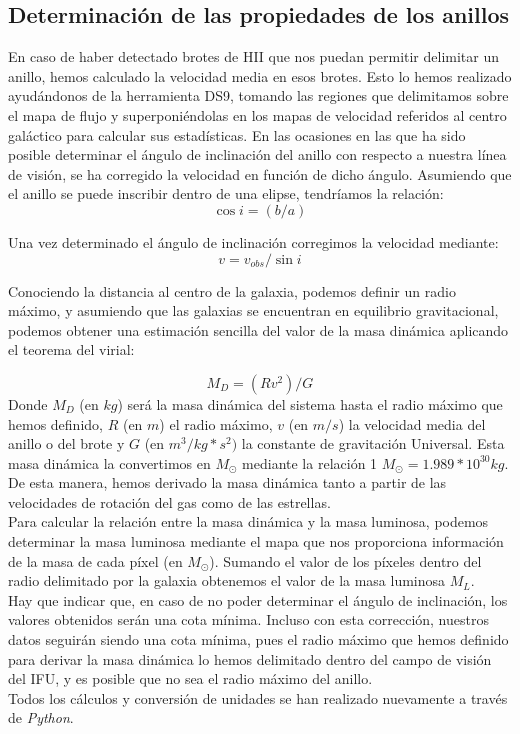 \documentclass{article}
\begin{document}
\subsection{Determinación de las propiedades de los anillos}
En caso de haber detectado brotes de HII que nos puedan permitir delimitar un anillo, hemos calculado la velocidad media en esos brotes. Esto lo hemos realizado ayudándonos de la herramienta DS9, tomando las regiones que delimitamos sobre el mapa de flujo y superponiéndolas en los mapas de velocidad referidos al centro galáctico para calcular sus estadísticas. 
En las ocasiones en las que ha sido posible determinar el ángulo de inclinación del anillo con respecto a nuestra línea de visión, se ha corregido la velocidad en función de dicho ángulo. Asumiendo que el anillo se puede inscribir dentro de una elipse, tendríamos la relación:
\begin{equation}
\cos i=(b/a)
\end{equation}

Una vez determinado el ángulo de inclinación corregimos la velocidad mediante:
\begin{equation}
v=v_{obs}/\sin i
\end{equation}

Conociendo la distancia al centro de la galaxia, podemos definir un radio máximo, y asumiendo que las galaxias se encuentran en equilibrio gravitacional, podemos obtener una estimación sencilla del valor de la masa dinámica aplicando el teorema del virial:

\begin{equation}
M_{D}=(Rv^{2})/G
\end{equation}
Donde $M_{D}$ (en $kg$) será la masa dinámica del sistema hasta el radio máximo que hemos definido, $R$ (en $m$) el radio máximo, $v$ (en $m/s$) la velocidad media del anillo o del brote y $G$ (en $m^{3}/kg*s^{2})$ la constante de gravitación Universal. Esta masa dinámica la convertimos en $M_{\odot}$ mediante la relación 1 $M_{\odot} = 1.989 * 10^{30} kg$.
De esta manera, hemos derivado la masa dinámica tanto a partir de las velocidades de rotación del gas como de las estrellas.\\Para calcular la relación entre la masa dinámica y la masa luminosa, podemos determinar la masa luminosa mediante el mapa que nos proporciona información de la masa de cada píxel (en $M_{\odot}$). Sumando el valor de los píxeles dentro del radio delimitado por la galaxia obtenemos el valor de la masa luminosa $M_{L}$.\\Hay que indicar que, en caso de no poder determinar el ángulo de inclinación, los valores obtenidos serán una cota mínima. Incluso con esta corrección, nuestros datos seguirán siendo una cota mínima, pues el radio máximo que hemos definido para derivar la masa dinámica lo hemos delimitado dentro del campo de visión del IFU, y es posible que no sea el radio máximo del anillo.\\ Todos los cálculos y conversión de unidades se han realizado nuevamente a través de \emph{Python}.
\end{document}
